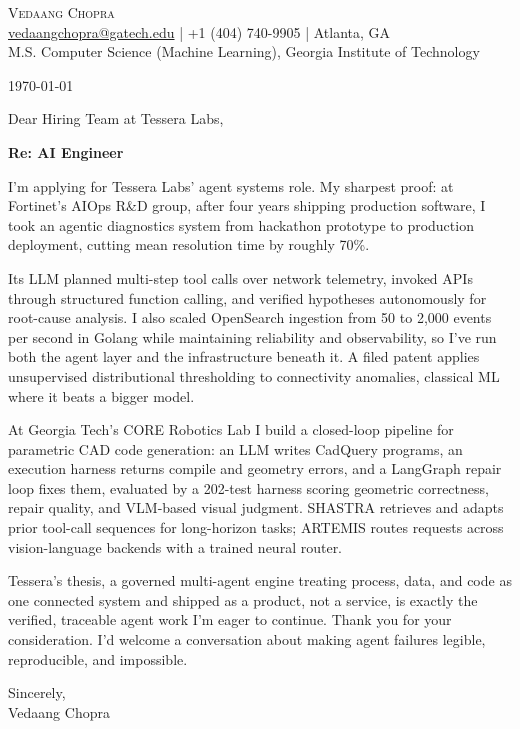 \documentclass[letterpaper,11pt]{article}
\newcommand{\letterPara}[1]{\noindent #1 \vspace{10pt}}
\begin{document}
\begin{center}
  {\LARGE \scshape Vedaang Chopra} \\ \vspace{4pt}
  \small \href{mailto:vedaangchopra@gatech.edu}{vedaangchopra@gatech.edu} \;|\; +1 (404) 740-9905 \;|\; Atlanta, GA \\ \vspace{2pt}
  \small M.S. Computer Science (Machine Learning), Georgia Institute of Technology
\end{center}
\vspace{-8pt}

\hfill \small \today

\noindent Dear Hiring Team at Tessera Labs,

\noindent \textbf{Re: AI Engineer}

\letterPara{I'm applying for Tessera Labs' agent systems role. My sharpest proof: at Fortinet's AIOps R\&D group, after four years shipping production software, I took an agentic diagnostics system from hackathon prototype to production deployment, cutting mean resolution time by roughly 70\%.}

\letterPara{Its LLM planned multi-step tool calls over network telemetry, invoked APIs through structured function calling, and verified hypotheses autonomously for root-cause analysis. I also scaled OpenSearch ingestion from 50 to 2,000 events per second in Golang while maintaining reliability and observability, so I've run both the agent layer and the infrastructure beneath it. A filed patent applies unsupervised distributional thresholding to connectivity anomalies, classical ML where it beats a bigger model.}

\letterPara{At Georgia Tech's CORE Robotics Lab I build a closed-loop pipeline for parametric CAD code generation: an LLM writes CadQuery programs, an execution harness returns compile and geometry errors, and a LangGraph repair loop fixes them, evaluated by a 202-test harness scoring geometric correctness, repair quality, and VLM-based visual judgment. SHASTRA retrieves and adapts prior tool-call sequences for long-horizon tasks; ARTEMIS routes requests across vision-language backends with a trained neural router.}

\letterPara{Tessera's thesis, a governed multi-agent engine treating process, data, and code as one connected system and shipped as a product, not a service, is exactly the verified, traceable agent work I'm eager to continue. Thank you for your consideration. I'd welcome a conversation about making agent failures legible, reproducible, and impossible.}

\noindent Sincerely,\\[4pt] Vedaang Chopra
\end{document}
